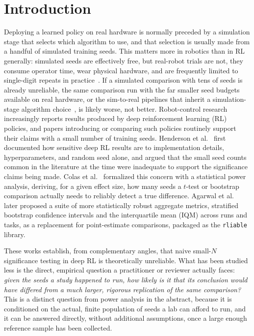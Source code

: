 \documentclass[journal]{IEEEtran}
\begin{document}
\section{Introduction}

Deploying a learned policy on real hardware is normally preceded by a simulation stage that
selects which algorithm to use, and that selection is usually made from a handful of simulated
training seeds. This matters more in robotics than in RL generally: simulated seeds are
effectively free, but real-robot trials are not, they consume operator time, wear physical
hardware, and are frequently limited to single-digit repeats in
practice~\cite{mahmood2018benchmarking,dulac2021challenges}. If a simulated comparison with tens
of seeds is already unreliable, the same comparison run with the far smaller seed budgets
available on real hardware, or the sim-to-real pipelines that inherit a simulation-stage algorithm
choice~\cite{zhao2020simtoreal}, is likely worse, not better. Robot-control research increasingly
reports results produced by deep reinforcement learning (RL) policies, and papers introducing or
comparing such policies routinely support their claims with a small number of training seeds.
Henderson et al.~\cite{henderson2018deep} first documented how
sensitive deep RL results are to implementation details, hyperparameters, and random seed alone,
and argued that the small seed counts common in the literature at the time were inadequate to
support the significance claims being made. Colas et al.~\cite{colas2018many} formalized this
concern with a statistical power analysis, deriving, for a given effect size, how many seeds a
$t$-test or bootstrap comparison actually needs to reliably detect a true difference. Agarwal et
al.~\cite{agarwal2021deep} later proposed a suite of more statistically robust aggregate metrics,
stratified bootstrap confidence intervals and the interquartile mean (IQM) across runs and tasks,
as a replacement for point-estimate comparisons, packaged as the \texttt{rliable} library.

These works establish, from complementary angles, that naive small-$N$ significance testing in
deep RL is theoretically unreliable. What has been studied less is the direct, empirical question
a practitioner or reviewer actually faces: \emph{given the seeds a study happened to run, how
likely is it that its conclusion would have differed from a much larger, rigorous replication
of the same comparison?} This is a distinct question from power analysis in the abstract, because
it is conditioned on the actual, finite population of seeds a lab can afford to run, and it can be
answered directly, without additional assumptions, once a large enough reference sample has been
collected.
\end{document}
